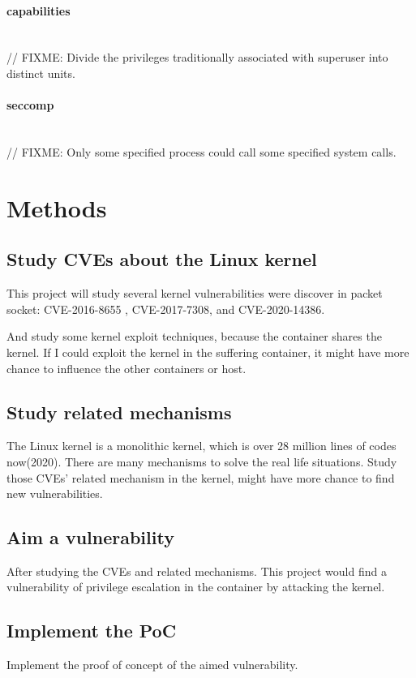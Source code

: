 \documentclass[12pt,a4paper,oneside,draft]{IEEEconf}
\begin{document}
\paragraph{capabilities}\mbox{}\\
// FIXME: Divide the privileges traditionally associated with superuser into distinct
units.

\paragraph{seccomp}\mbox{}\\
// FIXME: Only some specified process could call some specified system calls.


\section{Methods}
\subsection{Study CVEs about the Linux kernel}
This project will study several kernel vulnerabilities were discover in packet socket: CVE-2016-8655
\cite{CVE-2016-8655}, CVE-2017-7308\cite{CVE-2017-7308}, and CVE-2020-14386\cite{CVE-2020-14386}.

And study some kernel exploit techniques\cite{Kernel_exploitation}, because the container shares
the kernel. If I could exploit the kernel in the suffering container, it might have more chance
to influence the other containers or host.

\subsection{Study related mechanisms}
The Linux kernel is a monolithic kernel, which is over 28 million lines of codes now(2020). There
are many mechanisms to solve the real life situations. Study those CVEs' related mechanism in the
kernel, might have more chance to find new vulnerabilities.

\subsection{Aim a vulnerability}
After studying the CVEs and related mechanisms. This project would find a vulnerability of privilege
escalation in the container by attacking the kernel.

\subsection{Implement the PoC}
Implement the proof of concept of the aimed vulnerability.
\end{document}
